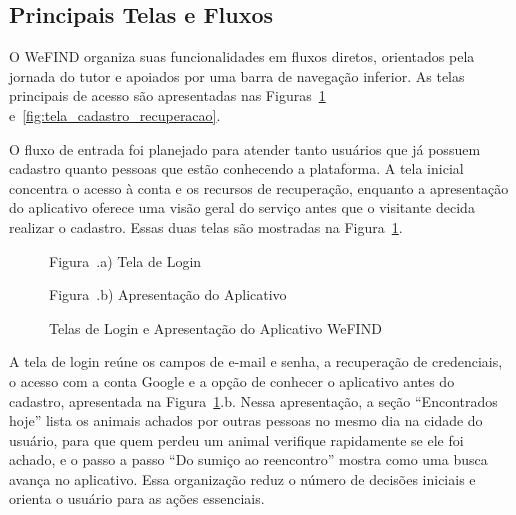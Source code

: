 \subsection{Principais Telas e Fluxos}

O WeFIND organiza suas funcionalidades em fluxos diretos, orientados pela jornada do tutor e apoiados por uma barra de navegação inferior. As telas principais de acesso são apresentadas nas Figuras~\ref{fig:telas_autenticacao} e~\ref{fig:tela_cadastro_recuperacao}.

O fluxo de entrada foi planejado para atender tanto usuários que já possuem cadastro quanto pessoas que estão conhecendo a plataforma. A tela inicial concentra o acesso à conta e os recursos de recuperação, enquanto a apresentação do aplicativo oferece uma visão geral do serviço antes que o visitante decida realizar o cadastro. Essas duas telas são mostradas na Figura~\ref{fig:telas_autenticacao}.

\begin{figure}[H]
    \centering
    \caption{Telas de Login e Apresentação do Aplicativo WeFIND}
    \label{fig:telas_autenticacao}
    \vspace{0.15cm}
    \begin{minipage}[t]{0.48\textwidth}
        \centering
        \par\vspace{0.15cm}
        {\small Figura~\thefigure.a) Tela de Login}
    \end{minipage}
    \hfill
    \begin{minipage}[t]{0.48\textwidth}
        \centering
        \par\vspace{0.15cm}
        {\small Figura~\thefigure.b) Apresentação do Aplicativo}
    \end{minipage}
    \par\vspace{0.15cm}
\end{figure}

A tela de login reúne os campos de e-mail e senha, a recuperação de credenciais, o acesso com a conta Google e a opção de conhecer o aplicativo antes do cadastro, apresentada na Figura~\ref{fig:telas_autenticacao}.b. Nessa apresentação, a seção ``Encontrados hoje'' lista os animais achados por outras pessoas no mesmo dia na cidade do usuário, para que quem perdeu um animal verifique rapidamente se ele foi achado, e o passo a passo ``Do sumiço ao reencontro'' mostra como uma busca avança no aplicativo. Essa organização reduz o número de decisões iniciais e orienta o usuário para as ações essenciais.

